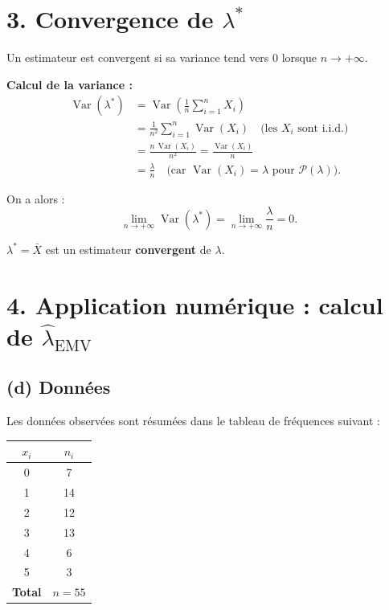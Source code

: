 \documentclass[12pt,a4paper]{article}
\begin{document}
\section*{3. Convergence de $\lambda^{*}$}

Un estimateur est convergent si sa variance tend vers $0$ lorsque
$n \to +\infty$.

\medskip
\textbf{Calcul de la variance :}
\begin{align*}
  \operatorname{Var}(\lambda^{*})
  &= \operatorname{Var}\!\left(\frac{1}{n}\sum_{i=1}^{n} X_i\right)\\[4pt]
  &= \frac{1}{n^{2}}\sum_{i=1}^{n} \operatorname{Var}(X_i)
     \quad \text{(les $X_i$ sont i.i.d.)}\\[4pt]
  &= \frac{n\,\operatorname{Var}(X_i)}{n^{2}}
  = \frac{\operatorname{Var}(X_i)}{n}\\[4pt]
  &= \frac{\lambda}{n}
     \quad \text{(car $\operatorname{Var}(X_i) = \lambda$ pour $\mathcal{P}(\lambda)$)}.
\end{align*}

On a alors :
\[
  \lim_{n \to +\infty} \operatorname{Var}(\lambda^{*})
  = \lim_{n \to +\infty} \frac{\lambda}{n}
  = 0.
\]

\begin{resultbox}
$\lambda^{*} = \bar{X}$ est un estimateur \textbf{convergent} de $\lambda$.
\end{resultbox}

\section*{4. Application numérique : calcul de $\hat{\lambda}_{\text{EMV}}$}

\subsection*{(d) Données}

Les données observées sont résumées dans le tableau de fréquences suivant :

\begin{center}
\renewcommand{\arraystretch}{1.3}
\begin{tabular}{|c|c|}
\hline
$x_i$ & $n_i$ \\
\hline
0 & 7  \\
1 & 14 \\
2 & 12 \\
3 & 13 \\
4 & 6  \\
5 & 3  \\
\hline
\textbf{Total} & $n = 55$ \\
\hline
\end{tabular}
\end{center}
\end{document}
